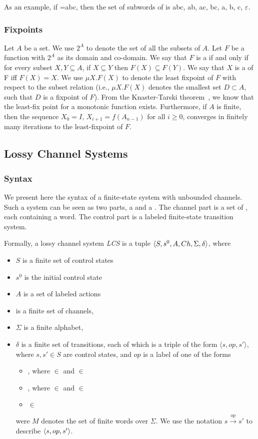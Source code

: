 As an example, if =abc, then the set of subwords of  is {abc, ab, ac, bc, a, b, c, $\varepsilon$}.

\subsubsection{Fixpoints}
Let $A$ be a set. We use $2^A$ to denote the set of all the subsets of $A$. Let $F$ be a function with $2^A$ as its domain and co-domain. We say that $F$ is a  if and only if for every subset $X,Y \subseteq A$, if $X \subseteq Y$ then $F(X) \subseteq F(Y)$.  We say that $X$ is a  of F iff $F(X)=X$. We use $\mu X. F(X)$ to denote the least fixpoint of $F$ with respect to the subset relation (i.e.,  $\mu X. F(X)$ denotes the smallest set $D \subset A$, such that $D$ is a fixpoint of $F$). From the Knaster-Tarski theorem~\cite{tarski}, we know that the least-fix point for a monotonic function exists. Furthermore, if $A$ is finite, then the sequence $X_0 = I$, $X_{i+1} = f(A_{n-1})$ for all $i \geq 0$, converges in finitely many iterations to the least-fixpoint of $F$.

\subsection{Lossy Channel Systems}
\label{CS}
\subsubsection{Syntax}
We present here the syntax of a finite-state system with unbounded channels. Such a system can be seen as two parts, a  and a . The channel part is a set of , each containing a word. The control part is a labeled finite-state transition system.

Formally, a lossy channel system \emph{LCS} is a tuple $\langle S,s^0, A, Ch,\Sigma, \delta\rangle$, where
\begin{itemize}
  \item $S$ is a finite set of control states
  \item $s^0$ is the initial control state
  \item $A$ is a set of labeled actions
  \item {} is a finite set of channels,
  \item $\Sigma$ is a finite alphabet,
  \item $\delta$ is a finite set of transitions, each of which is a triple of the form $\langle s,op,s'\rangle$, where $s, s'\in S$ are control states, and $op$ is a label of one of the forms
    \begin{itemize}
      \item {}, where  $\in$  and  $\in$ 
      \item {}, where  $\in$  and  $\in$ 
      \item {} $\in$ 
    \end{itemize}
    were $M$ denotes the set of finite words over $\Sigma$. We use the notation $s \xrightarrow{op} s'$ to describe $\langle s, op, s'\rangle$.
\end{itemize}

